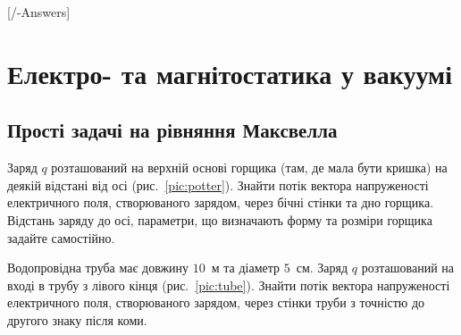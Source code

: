 
[\currfilebase/\currfilebase-Answers]
\chapter{Електро- та магнітостатика у вакуумі}\label{\currfilebase}

\section{Прості задачі на рівняння Максвелла}

\begin{problem}\label{prb:potter}
Заряд $q$ розташований на верхній основі горщика (там, де мала бути кришка) на деякій відстані від осі (рис.~\ref{pic:potter}). Знайти потік
вектора
напруженості електричного поля, створюваного зарядом, через бічні стінки та дно горщика. Відстань заряду до осі, параметри, що визначають
форму та
розміри горщика задайте самостійно.
\end{problem}

\begin{problem}\label{prb:tube}
Водопровідна труба має довжину $10$~м та діаметр $5$~см. Заряд $q$ розташований на вході в трубу з лівого кінця (рис.~\ref{pic:tube}).
Знайти потік вектора напруженості електричного поля, створюваного зарядом, через стінки труби з точністю до другого знаку після коми.
\end{problem}

